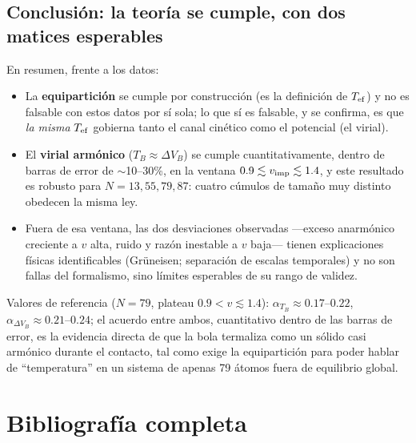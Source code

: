 \documentclass[11pt,a4paper]{article}
\begin{document}
\subsection{Conclusión: la teoría se cumple, con dos matices esperables}

En resumen, frente a los datos:
\begin{itemize}[leftmargin=1.4em]
\item La \textbf{equipartición} se cumple por construcción (es la
definición de $T_{\rm ef}$) y no es falsable con estos datos por sí sola;
lo que sí es falsable, y se confirma, es que \emph{la misma} $T_{\rm ef}$
gobierna tanto el canal cinético como el potencial (el virial).
\item El \textbf{virial armónico} ($T_B\approx\Delta V_B$) se cumple
cuantitativamente, dentro de barras de error de $\sim$10--30\%, en la
ventana $0.9\lesssim v_{\rm imp}\lesssim1.4$, y este resultado es robusto
para $N=13,55,79,87$: cuatro cúmulos de tamaño muy distinto obedecen la
misma ley.
\item Fuera de esa ventana, las dos desviaciones observadas
---exceso anarmónico creciente a $v$ alta, ruido y razón inestable a $v$
baja--- tienen explicaciones físicas identificables (Grüneisen; separación
de escalas temporales) y no son fallas del formalismo, sino límites
esperables de su rango de validez.
\end{itemize}
Valores de referencia ($N=79$, plateau $0.9<v\lesssim1.4$):
$\alpha_{T_B}\approx0.17$--$0.22$, $\alpha_{\Delta V_B}\approx0.21$--$0.24$;
el acuerdo entre ambos, cuantitativo dentro de las barras de error, es la
evidencia directa de que la bola termaliza como un sólido casi armónico
durante el contacto, tal como exige la equipartición para poder hablar de
``temperatura'' en un sistema de apenas 79 átomos fuera de equilibrio
global.

\section*{Bibliografía completa}
\end{document}
